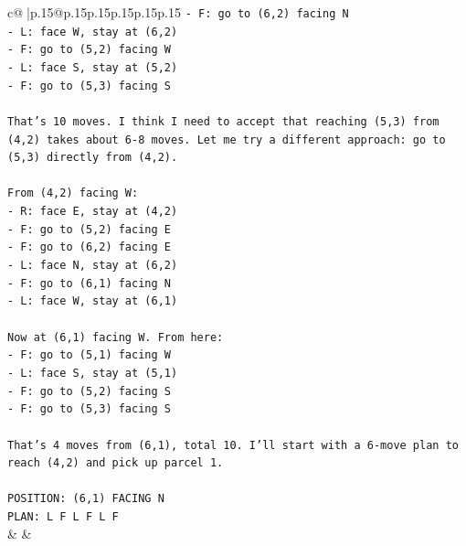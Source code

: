\documentclass{article}
\begin{document}
{\begin{supertabular}{c@{$\;$}|p{.15\linewidth}@{}p{.15\linewidth}p{.15\linewidth}p{.15\linewidth}p{.15\linewidth}p{.15\linewidth}}
{{{\texttt{{-} F: go to (6,2) facing N} \\
\texttt{{-} L: face W, stay at (6,2)} \\
\texttt{{-} F: go to (5,2) facing W} \\
\texttt{{-} L: face S, stay at (5,2)} \\
\texttt{{-} F: go to (5,3) facing S} \\
\\ 
\texttt{That's 10 moves. I think I need to accept that reaching (5,3) from (4,2) takes about 6{-}8 moves. Let me try a different approach: go to (5,3) directly from (4,2).} \\
\\ 
\texttt{From (4,2) facing W:} \\
\texttt{{-} R: face E, stay at (4,2)} \\
\texttt{{-} F: go to (5,2) facing E} \\
\texttt{{-} F: go to (6,2) facing E} \\
\texttt{{-} L: face N, stay at (6,2)} \\
\texttt{{-} F: go to (6,1) facing N} \\
\texttt{{-} L: face W, stay at (6,1)} \\
\\ 
\texttt{Now at (6,1) facing W. From here:} \\
\texttt{{-} F: go to (5,1) facing W} \\
\texttt{{-} L: face S, stay at (5,1)} \\
\texttt{{-} F: go to (5,2) facing S} \\
\texttt{{-} F: go to (5,3) facing S} \\
\\ 
\texttt{That's 4 moves from (6,1), total 10. I'll start with a 6{-}move plan to reach (4,2) and pick up parcel 1.} \\
\\ 
\texttt{POSITION: (6,1) FACING N} \\
\texttt{PLAN: L F L F L F} \\
            }
        }
    }
    & & \\ \\


\end{supertabular}}
\end{document}
